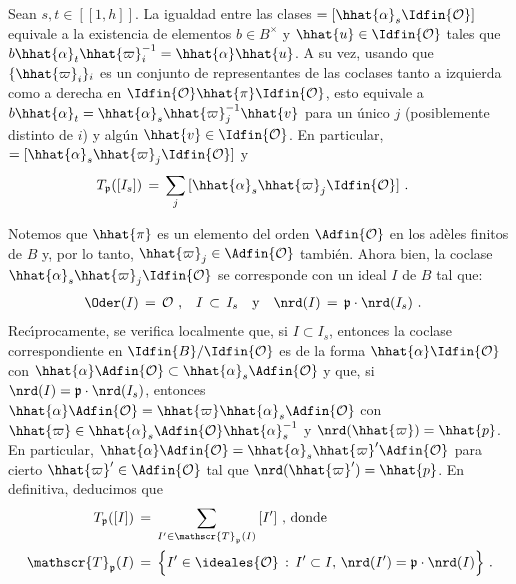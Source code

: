 Sean $s,t\in[\![1,h]\!]$. La igualdad entre las clases
\begin{math}
	[\hhat{\alpha}_{t}\hhat{\varpi}_{i}^{-1}\Idfin{\cal{O}}]=
		[\hhat{\alpha}_{s}\Idfin{\cal{O}}]
\end{math}
equivale a la existencia de elementos $b\in B^{\times}$ y
$\hhat{u}\in\Idfin{\cal{O}}$ tales que
$b\hhat{\alpha}_{t}\hhat{\varpi}_{i}^{-1}=\hhat{\alpha}\hhat{u}$.
A su vez, usando que $\{\hhat{\varpi}_{i}\}_{i}$ es un conjunto de
representantes de las coclases tanto a izquierda como a derecha en
$\Idfin{\cal{O}}\hhat{\pi}\Idfin{\cal{O}}$, esto equivale a
$b\hhat{\alpha}_{t}=\hhat{\alpha}_{s}\hhat{\varpi}_{j}^{-1}\hhat{v}$ para un
\'{u}nico $j$ (posiblemente distinto de $i$) y alg\'{u}n
$\hhat{v}\in\Idfin{\cal{O}}$. En particular,
\begin{math}
	[\hhat{\alpha}_{t}\Idfin{\cal{O}}]=
		[\hhat{\alpha}_{s}\hhat{\varpi}_{j}\Idfin{\cal{O}}]
\end{math}
y
\begin{align*}
	T_{\frak{p}}([I_{s}]) & \,=\,
		\sum_{j}\,[\hhat{\alpha}_{s}\hhat{\varpi}_{j}\Idfin{\cal{O}}]
	\text{ .}
\end{align*}
%

Notemos que $\hhat{\pi}$ es un elemento del orden $\Adfin{\cal{O}}$ en los
ad\`{e}les finitos de $B$ y, por lo tanto,
$\hhat{\varpi}_{j}\in\Adfin{\cal{O}}$ tambi\'{e}n. Ahora bien, la coclase
$\hhat{\alpha}_{s}\hhat{\varpi}_{j}\Idfin{\cal{O}}$ se corresponde con un ideal
$I$ de $B$ tal que:
\begin{align*}
	\Oder(I)\,=\,\cal{O}\text{ ,} & \quad
		I\,\subset\, I_{s} \quad\text{y}\quad
		\nrd(I)\,=\,\frak{p}\cdot\nrd(I_{s})
	\text{ .}
\end{align*}
%
Rec\'{\i}procamente, se verifica localmente que, si $I\subset I_{s}$, entonces
la coclase correspondiente en $\Idfin{B}/\Idfin{\cal{O}}$ es de la forma
$\hhat{\alpha}\Idfin{\cal{O}}$ con
$\hhat{\alpha}\Adfin{\cal{O}}\subset\hhat{\alpha}_{s}\Adfin{\cal{O}}$ y que, si
$\nrd(I)=\frak{p}\cdot\nrd(I_{s})$, entonces
$\hhat{\alpha}\Adfin{\cal{O}}=\hhat{\varpi}\hhat{\alpha}_{s}\Adfin{\cal{O}}$
con $\hhat{\varpi}\in\hhat{\alpha}_{s}\Adfin{\cal{O}}\hhat{\alpha}_{s}^{-1}$
y $\nrd(\hhat{\varpi})=\hhat{p}$. En particular,
$\hhat{\alpha}\Adfin{\cal{O}}=\hhat{\alpha}_{s}\hhat{\varpi}'\Adfin{\cal{O}}$
para cierto $\hhat{\varpi}'\in\Adfin{\cal{O}}$ tal que
$\nrd(\hhat{\varpi}')=\hhat{p}$. En definitiva, deducimos que
\begin{align*}
	T_{\frak{p}}([I]) & \,=\,
	\sum_{I'\in\mathscr{T}_{\frak{p}}(I)}\,[I']\text{ , donde} \\
	\mathscr{T}_{\frak{p}}(I) & \,=\,
		\Big\{ I'\in\ideales{\cal{O}}\,:\,
			I'\subset I,\,\nrd(I')=\frak{p}\cdot\nrd(I)\Big\}
	\text{ .}
\end{align*}
%

